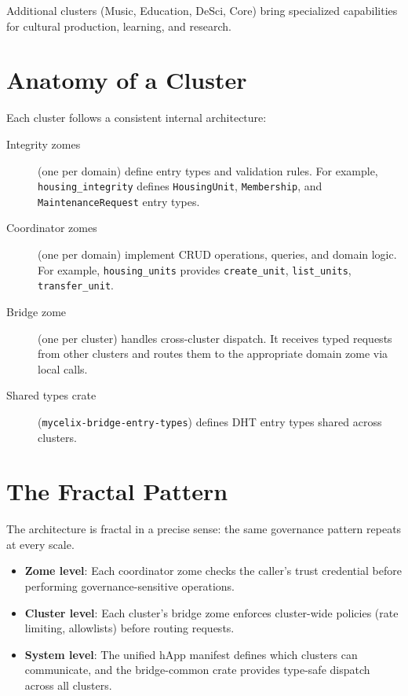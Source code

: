 \documentclass[12pt]{book}
\begin{document}
Additional clusters (Music, Education, DeSci, Core) bring specialized
capabilities for cultural production, learning, and research.

\section{Anatomy of a Cluster}

Each cluster follows a consistent internal architecture:

\begin{description}
  \item[Integrity zomes] (one per domain) define entry types and validation rules.
    For example, \texttt{housing\_integrity} defines \texttt{HousingUnit},
    \texttt{Membership}, and \texttt{MaintenanceRequest} entry types.
  \item[Coordinator zomes] (one per domain) implement CRUD operations, queries,
    and domain logic. For example, \texttt{housing\_units} provides
    \texttt{create\_unit}, \texttt{list\_units}, \texttt{transfer\_unit}.
  \item[Bridge zome] (one per cluster) handles cross-cluster dispatch. It
    receives typed requests from other clusters and routes them to the
    appropriate domain zome via local calls.
  \item[Shared types crate] (\texttt{mycelix-bridge-entry-types}) defines DHT
    entry types shared across clusters.
\end{description}

\section{The Fractal Pattern}

The architecture is fractal in a precise sense: the same governance pattern
repeats at every scale.

\begin{itemize}
  \item \textbf{Zome level}: Each coordinator zome checks the caller's
    trust credential before performing governance-sensitive operations.
  \item \textbf{Cluster level}: Each cluster's bridge zome enforces cluster-wide
    policies (rate limiting, allowlists) before routing requests.
  \item \textbf{System level}: The unified hApp manifest defines which clusters
    can communicate, and the bridge-common crate provides type-safe dispatch
    across all clusters.
\end{itemize}
\end{document}
